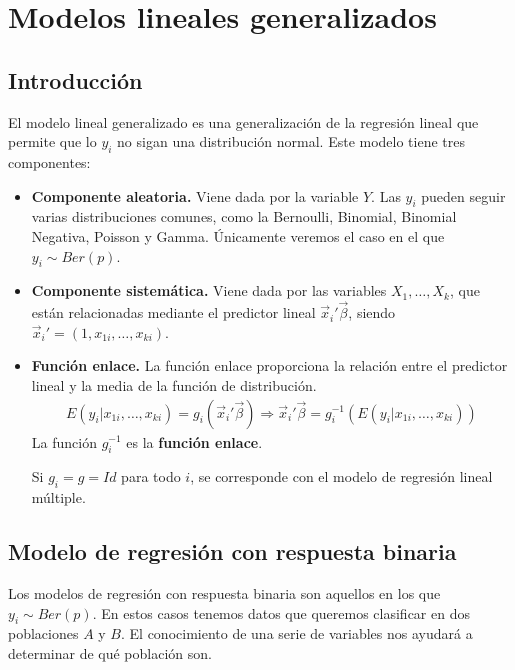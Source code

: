 \chapter{Modelos lineales generalizados}

\section{Introducción}
El modelo lineal generalizado es una generalización de la regresión lineal que permite que lo $y_i$ no sigan una distribución normal. Este modelo tiene tres componentes:
\begin{itemize}
    \item \textbf{Componente aleatoria.}
          Viene dada por la variable $Y$.
          Las $y_i$ pueden seguir varias distribuciones comunes, como la Bernoulli, Binomial, Binomial Negativa, Poisson y Gamma.
          Únicamente veremos el caso en el que $y_i \sim Ber(p)$.
    \item \textbf{Componente sistemática.}
          Viene dada por las variables $X_1, \dots, X_k$, que están relacionadas mediante el predictor lineal $\vec{x}_i'\vec{\beta}$, siendo $\vec{x}_i' = (1, x_{1i}, \dots, x_{ki})$.

    \item \textbf{Función enlace.}
          La función enlace proporciona la relación entre el predictor lineal y la media de la función de distribución.
          \begin{align*}
              E(y_i | x_{1i}, \dots, x_{ki}) = g_i(\vec{x}_i'\vec{\beta}) \Rightarrow \vec{x}_i'\vec{\beta} = g_i^{-1}(E(y_i | x_{1i}, \dots, x_{ki}))
          \end{align*}
          La función $g_i^{-1}$ es la \textbf{función enlace}.
          \begin{obs}
              Si $g_i = g = Id$ para todo $i$, se corresponde con el modelo de regresión lineal múltiple.
          \end{obs}
\end{itemize}

\section{Modelo de regresión con respuesta binaria}
Los modelos de regresión con respuesta binaria son aquellos en los que $y_i \sim Ber(p)$. En estos casos tenemos datos que queremos clasificar en dos poblaciones $A$ y $B$. El conocimiento de una serie de variables nos ayudará a determinar de qué población son.


